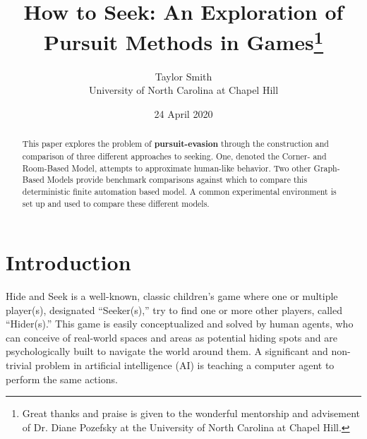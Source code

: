 \documentclass[12pt]{article}
\begin{document}
\title{How to Seek: An Exploration of Pursuit Methods in Games\thanks{Great thanks and praise is given to the wonderful mentorship and advisement of Dr. Diane Pozefsky at the University of North Carolina at Chapel Hill.}}
\author{Taylor Smith 
\\
University of North Carolina at Chapel Hill		
}
\date{24 April 2020}
\maketitle
\begin{abstract}
This paper explores the problem of \textbf{pursuit-evasion} through the construction and comparison of three different approaches to seeking. One, denoted the Corner- and Room-Based Model, attempts to approximate human-like behavior. Two other Graph-Based Models provide benchmark comparisons against which to compare this deterministic finite automation based model. A common experimental environment is set up and used to compare these different models.
\end{abstract}

\section{Introduction}
Hide and Seek is a well-known, classic children's game where one or multiple player(s), designated ``Seeker(s),'' try to find one or more other players, called ``Hider(s).'' This game is easily conceptualized and solved by human agents, who can conceive of real-world spaces and areas as potential hiding spots and are psychologically built to navigate the world around them. A significant and non-trivial problem in artificial intelligence (AI) is teaching a computer agent to perform the same actions.
\end{document}
